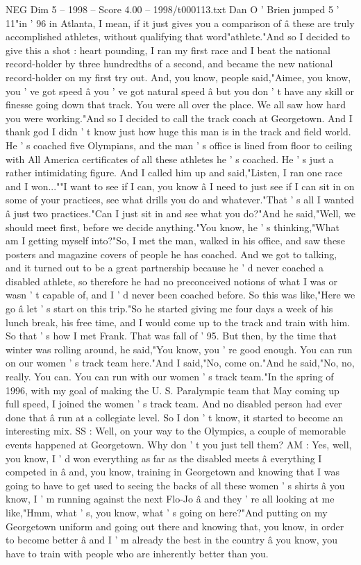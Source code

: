 \begin{textsample}{NEG Dim 5 – 1998 – Score 4.00 – 1998/t000113.txt}
Dan O ' Brien jumped 5 ' 11"in ' 96 in Atlanta, I mean, if it just gives you a comparison of â these are truly accomplished athletes, without qualifying that word"athlete."And so I decided to give this a shot : heart pounding, I ran my first race and I beat the national record-holder by three hundredths of a second, and became the new national record-holder on my first try out.
And, you know, people said,"Aimee, you know, you ' ve got speed â you ' ve got natural speed â but you don ' t have any skill or finesse going down that track.
You were all over the place.
We all saw how hard you were working."And so I decided to call the track coach at Georgetown.
And I thank god I didn ' t know just how huge this man is in the track and field world.
He ' s coached five Olympians, and the man ' s office is lined from floor to ceiling with All America certificates of all these athletes he ' s coached.
He ' s just a rather intimidating figure.
And I called him up and said,"Listen, I ran one race and I won...""I want to see if I can, you know â I need to just see if I can sit in on some of your practices, see what drills you do and whatever."That ' s all I wanted â just two practices."Can I just sit in and see what you do?"And he said,"Well, we should meet first, before we decide anything."You know, he ' s thinking,"What am I getting myself into?"So, I met the man, walked in his office, and saw these posters and magazine covers of people he has coached.
And we got to talking, and it turned out to be a great partnership because he ' d never coached a disabled athlete, so therefore he had no preconceived notions of what I was or wasn ' t capable of, and I ' d never been coached before.
So this was like,"Here we go â let ' s start on this trip."So he started giving me four days a week of his lunch break, his free time, and I would come up to the track and train with him.
So that ' s how I met Frank.
That was fall of ' 95.
But then, by the time that winter was rolling around, he said,"You know, you ' re good enough.
You can run on our women ' s track team here."And I said,"No, come on."And he said,"No, no, really.
You can.
You can run with our women ' s track team."In the spring of 1996, with my goal of making the U.
S.
Paralympic team that May coming up full speed, I joined the women ' s track team.
And no disabled person had ever done that â run at a collegiate level.
So I don ' t know, it started to become an interesting mix.
SS : Well, on your way to the Olympics, a couple of memorable events happened at Georgetown.
Why don ' t you just tell them?
AM : Yes, well, you know, I ' d won everything as far as the disabled meets â everything I competed in â and, you know, training in Georgetown and knowing that I was going to have to get used to seeing the backs of all these women ' s shirts â you know, I ' m running against the next Flo-Jo â and they ' re all looking at me like,"Hmm, what ' s, you know, what ' s going on here?"And putting on my Georgetown uniform and going out there and knowing that, you know, in order to become better â and I ' m already the best in the country â you know, you have to train with people who are inherently better than you.

\end{textsample}
